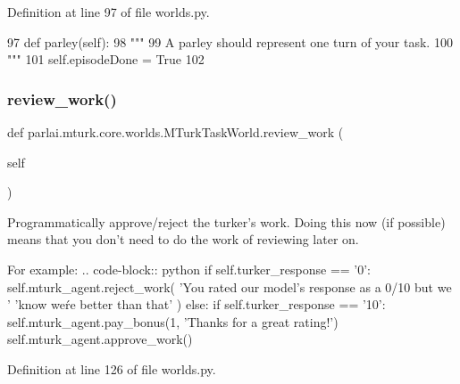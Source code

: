Definition at line 97 of file worlds.\+py.


\begin{DoxyCode}
97     \textcolor{keyword}{def }parley(self):
98         \textcolor{stringliteral}{"""}
99 \textcolor{stringliteral}{        A parley should represent one turn of your task.}
100 \textcolor{stringliteral}{        """}
101         self.episodeDone = \textcolor{keyword}{True}
102 
\end{DoxyCode}
\mbox{\label{classparlai_1_1mturk_1_1core_1_1worlds_1_1MTurkTaskWorld_ac601ef19c221a1ec43ecbaa322ff67a4}} 
\subsubsection{\texorpdfstring{review\+\_\+work()}{review\_work()}}
{\footnotesize\ttfamily def parlai.\+mturk.\+core.\+worlds.\+M\+Turk\+Task\+World.\+review\+\_\+work (\begin{DoxyParamCaption}\item[{}]{self }\end{DoxyParamCaption})}

\begin{DoxyVerb}Programmatically approve/reject the turker's work. Doing this now (if possible)
means that you don't need to do the work of reviewing later on.

For example:
.. code-block:: python
    if self.turker_response == '0':
self.mturk_agent.reject_work(
    'You rated our model's response as a 0/10 but we '
    'know we\'re better than that'
)
    else:
if self.turker_response == '10':
    self.mturk_agent.pay_bonus(1, 'Thanks for a great rating!')
self.mturk_agent.approve_work()
\end{DoxyVerb}
 

Definition at line 126 of file worlds.\+py.



